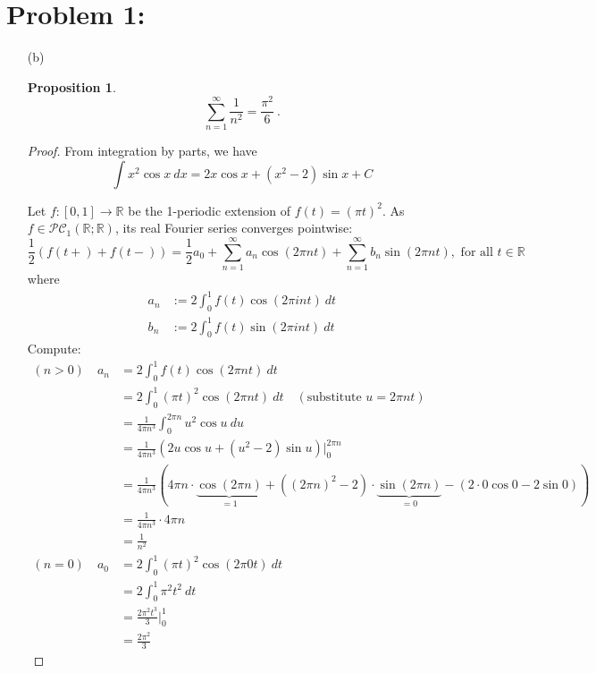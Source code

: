 \documentclass[12pt, reqno]{amsart}
\newtheorem{prop}{Proposition}[section]
\theoremstyle{definition}
\theoremstyle{remark}
\begin{document}
\section*{Problem 1:}
\begin{itemize}

\item[(b)] 

\begin{prop}
\begin{equation} \label{eq_basel}
\sum_{n=1}^\infty \dfrac{1}{n^2} = \frac{\pi^2}{6} ~\mbox{.}
\end{equation}
\end{prop}

\begin{proof}
    From integration by parts, we have $$\int x^{2}\cos x\ dx=2x\cos x+(x^{2}-2)\sin x+C$$

    Let $f:[0,1]\rightarrow \mathbb{R}$ be the 1-periodic extension of $f(t)=(\pi t)^{2}$. As $f\in\mathcal{PC}_{1}(\mathbb{R};\mathbb{R})$, its real Fourier series converges pointwise: $$\frac{1}{2}(f(t+)+f(t-))= \frac{1}{2}a_{0}+\sum_{n=1}^{\infty}a_{n}\cos(2\pi nt)+\sum_{n=1}^{\infty}b_{n}\sin(2\pi nt),\text{ for all }t\in \mathbb{R}$$where \begin{align*}
        a_{n}&:= 2\int_{0}^{1}f(t)\cos(2\pi int)\ dt\\
        b_{n}&:= 2\int_{0}^{1}f(t)\sin(2\pi int)\ dt
        \end{align*}
        Compute: \begin{align*}
        (n>0)\quad a_{n}&= 2\int_{0}^{1}f(t)\cos(2\pi nt)\ dt\\
        &= 2\int_{0}^{1}(\pi t)^{2}\cos(2\pi nt)\ dt\quad(\text{substitute }u=2\pi nt)\\
        &= \frac{1}{4\pi n^{3}}\int_{0}^{2\pi n}u^{2}\cos u\ du\\
        &= \frac{1}{4\pi n^{3}}(2u\cos u+(u^{2}-2)\sin u)\bigg|_{0}^{2\pi n}\\
        &= \frac{1}{4\pi n^{3}}(4\pi n \cdot\underbrace{\cos(2\pi n)}_{=1}+((2\pi n)^{2}-2)\cdot\underbrace{\sin (2\pi n)}_{=0}-(2\cdot0\cos 0-2\sin0))\\
        &= \frac{1}{{4\pi n^{3}}}\cdot 4\pi n\\
        &= \frac{1}{n^{2}}\\
        (n=0)\quad a_{0}&= 2\int_{0}^{1}(\pi t)^{2}\cos(2\pi 0t)\ dt\\
        &= 2\int_{0}^{1}\pi^{2}t^{2}\ dt\\
        &= \frac{2\pi^{2}t^{3}}{3}\bigg|_{0}^{1}\\
        &= \frac{2\pi^{2}}{3}
        \end{align*}
        

\end{proof}
\end{itemize}
\end{document}
